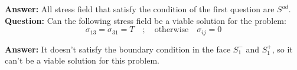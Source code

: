 \documentclass[letter,12pt]{article}
\begin{document}
 \noindent \textbf{Answer:} All stress field that satisfy the condition of the first question are $S^{ad}$.
 \\
 
 \noindent \textbf{Question:} Can the following stress field be a viable solution for the problem:
 \begin{equation}
 \sigma_{13}=\sigma_{31}=T \quad ; \quad \text{otherwise} \quad  \sigma_{ij} =0 
 \end{equation} 
 
 \noindent \textbf{Answer:}
 It doesn't satisfy the boundary condition in the face $S_{1}^{-}$ and $S_{1}^{+}$, so it can't be a viable solution for this problem.




 
 
 


 
\end{document}
